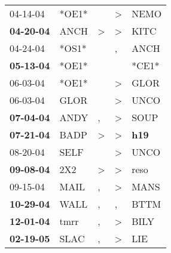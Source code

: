 \begin{supertabular}{p{0.07\textwidth}p{0.06\textwidth}p{0.02\textwidth}p{0.02\textwidth}p{0.06\textwidth}}
          04-14-04\textsuperscript{} &                            *OE1* &                  &     \textgreater &           NEMO\textsuperscript{} \\
 \textbf{04-20-04\textsuperscript{}} &           ANCH\textsuperscript{} &     \textgreater &     \textgreater &           KITC\textsuperscript{} \\
          04-24-04\textsuperscript{} &                            *OS1* &                  &                , &           ANCH\textsuperscript{} \\
 \textbf{05-13-04\textsuperscript{}} &                            *OE1* &                  &                  &                            *CE1* \\
          06-03-04\textsuperscript{} &                            *OE1* &                  &     \textgreater &           GLOR\textsuperscript{} \\
          06-03-04\textsuperscript{} &           GLOR\textsuperscript{} &                  &     \textgreater &           UNCO\textsuperscript{} \\
 \textbf{07-04-04\textsuperscript{}} &           ANDY\textsuperscript{} &                , &     \textgreater &           SOUP\textsuperscript{} \\
 \textbf{07-21-04\textsuperscript{}} &           BADP\textsuperscript{} &     \textgreater &     \textgreater &   \textbf{h19\textsuperscript{}} \\
          08-20-04\textsuperscript{} &           SELF\textsuperscript{} &                  &     \textgreater &           UNCO\textsuperscript{} \\
 \textbf{09-08-04\textsuperscript{}} &            2X2\textsuperscript{} &     \textgreater &     \textgreater &           reso\textsuperscript{} \\
          09-15-04\textsuperscript{} &           MAIL\textsuperscript{} &                , &     \textgreater &           MANS\textsuperscript{} \\
 \textbf{10-29-04\textsuperscript{}} &           WALL\textsuperscript{} &                , &                , &           BTTM\textsuperscript{} \\
 \textbf{12-01-04\textsuperscript{}} &           tmrr\textsuperscript{} &                , &     \textgreater &           BILY\textsuperscript{} \\
 \textbf{02-19-05\textsuperscript{}} &           SLAC\textsuperscript{} &                , &     \textgreater &            LIE\textsuperscript{} \\

\end{supertabular}
